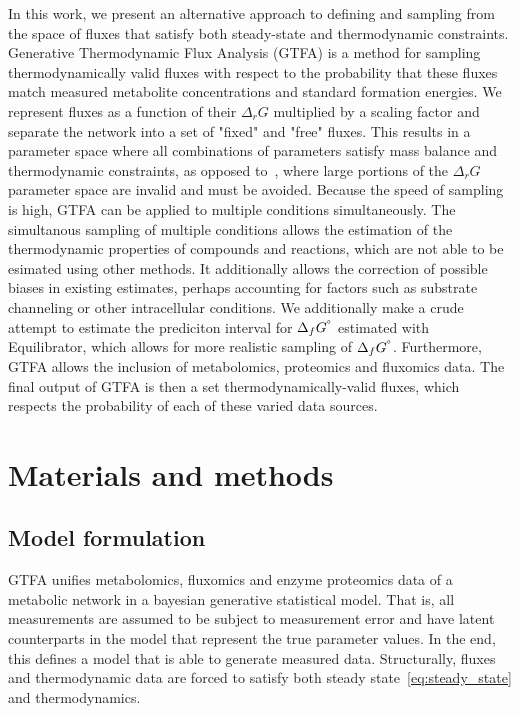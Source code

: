 \documentclass[10pt,letterpaper]{article}
\newcommand{\sdgf}{\Delta_fG^{\degree}}
\newcommand{\dgr}{\Delta_rG}
\begin{document}
In this work, we present an alternative approach to defining and sampling from the space of fluxes that satisfy both steady-state and thermodynamic constraints.
Generative Thermodynamic Flux Analysis (GTFA) is a method for sampling thermodynamically valid fluxes with respect to the probability that these fluxes match measured metabolite concentrations and standard formation energies.
We represent fluxes as a function of their $\dgr$ multiplied by a scaling factor and separate the network into a set of "fixed" and "free" fluxes.
This results in a parameter space where all combinations of parameters satisfy mass balance and thermodynamic constraints, as opposed to~\cite{PTA}, where large portions of the $\dgr$ parameter space are invalid and must be avoided.
Because the speed of sampling is high, GTFA can be applied to multiple conditions simultaneously.
The simultanous sampling of multiple conditions allows the estimation of the thermodynamic properties of compounds and reactions, which are not able to be esimated using other methods.
It additionally allows the correction of possible biases in existing estimates, perhaps accounting for factors such as substrate channeling or other intracellular conditions.
We additionally make a crude attempt to estimate the prediciton interval for $\sdgf$ estimated with Equilibrator, which allows for more realistic sampling of $\sdgf$.
Furthermore, GTFA allows the inclusion of metabolomics, proteomics and fluxomics data.
The final output of GTFA is then a set thermodynamically-valid fluxes, which respects the probability of each of these varied data sources.


\section*{Materials and methods}

\subsection{Model formulation}
GTFA unifies metabolomics, fluxomics and enzyme proteomics data of a metabolic network in a bayesian generative statistical model.
That is, all measurements are assumed to be subject to measurement error and have latent counterparts in the model that represent the true parameter values.
In the end, this defines a model that is able to generate measured data.
Structurally, fluxes and thermodynamic data are forced to satisfy both steady state~\ref{eq:steady_state} and thermodynamics.
\end{document}

